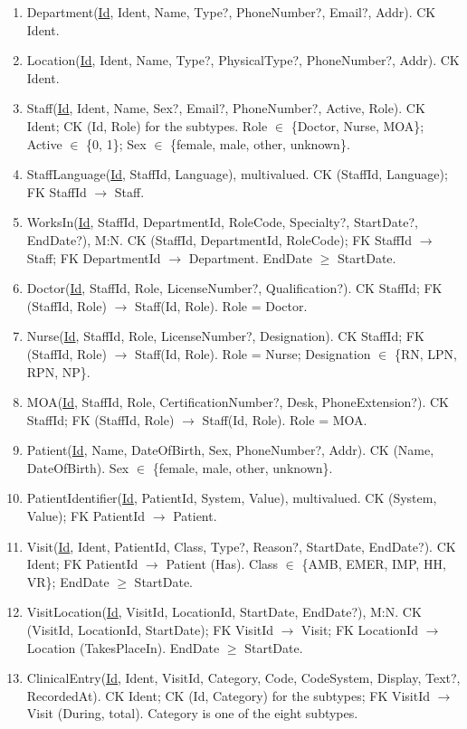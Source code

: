 \documentclass[sigconf]{acmart}
\begin{document}
\begin{enumerate}\setlength{\itemsep}{0pt}\setlength{\parskip}{0pt}
\item Department(\underline{Id}, Ident, Name, Type?, PhoneNumber?, Email?, Addr). CK Ident.
\item Location(\underline{Id}, Ident, Name, Type?, PhysicalType?, PhoneNumber?, Addr). CK Ident.
\item Staff(\underline{Id}, Ident, Name, Sex?, Email?, PhoneNumber?, Active, Role). CK Ident; CK (Id, Role) for the subtypes. Role $\in$ \{Doctor, Nurse, MOA\}; Active $\in$ \{0, 1\}; Sex $\in$ \{female, male, other, unknown\}.
\item StaffLanguage(\underline{Id}, StaffId, Language), multivalued. CK (StaffId, Language); FK StaffId $\to$ Staff.
\item WorksIn(\underline{Id}, StaffId, DepartmentId, RoleCode, Specialty?, StartDate?, EndDate?), M:N. CK (StaffId, DepartmentId, RoleCode); FK StaffId $\to$ Staff; FK DepartmentId $\to$ Department. EndDate $\ge$ StartDate.
\item Doctor(\underline{Id}, StaffId, Role, LicenseNumber?, Qualification?). CK StaffId; FK (StaffId, Role) $\to$ Staff(Id, Role). Role = Doctor.
\item Nurse(\underline{Id}, StaffId, Role, LicenseNumber?, Designation). CK StaffId; FK (StaffId, Role) $\to$ Staff(Id, Role). Role = Nurse; Designation $\in$ \{RN, LPN, RPN, NP\}.
\item MOA(\underline{Id}, StaffId, Role, CertificationNumber?, Desk, PhoneExtension?). CK StaffId; FK (StaffId, Role) $\to$ Staff(Id, Role). Role = MOA.
\item Patient(\underline{Id}, Name, DateOfBirth, Sex, PhoneNumber?, Addr). CK (Name, DateOfBirth). Sex $\in$ \{female, male, other, unknown\}.
\item PatientIdentifier(\underline{Id}, PatientId, System, Value), multivalued. CK (System, Value); FK PatientId $\to$ Patient.
\item Visit(\underline{Id}, Ident, PatientId, Class, Type?, Reason?, StartDate, EndDate?). CK Ident; FK PatientId $\to$ Patient (Has). Class $\in$ \{AMB, EMER, IMP, HH, VR\}; EndDate $\ge$ StartDate.
\item VisitLocation(\underline{Id}, VisitId, LocationId, StartDate, EndDate?), M:N. CK (VisitId, LocationId, StartDate); FK VisitId $\to$ Visit; FK LocationId $\to$ Location (TakesPlaceIn). EndDate $\ge$ StartDate.
\item ClinicalEntry(\underline{Id}, Ident, VisitId, Category, Code, CodeSystem, Display, Text?, RecordedAt). CK Ident; CK (Id, Category) for the subtypes; FK VisitId $\to$ Visit (During, total). Category is one of the eight subtypes.

\end{enumerate}
\end{document}
